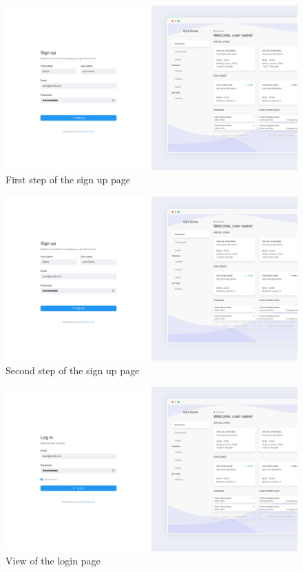 \documentclass[a4paper, 12pt, oneside]{book}
\begin{document}
\begin{figure}[h!]
	\centering
	\includegraphics[width=\textwidth]{assets/ui/SignUpStepOne.png}
	\caption{First step of the sign up page}
\end{figure}
\begin{figure}[h!]
	\centering
	\includegraphics[width=\textwidth]{assets/ui/SignUpStepOne.png}
	\caption{Second step of the sign up page}
\end{figure}
\begin{figure}[h!]
	\centering
	\includegraphics[width=\textwidth]{assets/ui/LogIn.png}
	\caption{View of the login page}
\end{figure}
\end{document}
